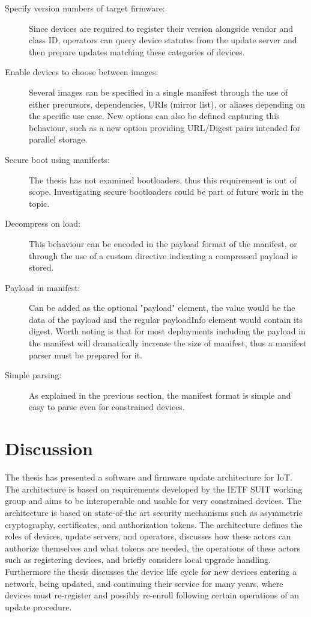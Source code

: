 \documentclass[0-thesis.tex]{subfiles}
\begin{document}
\begin{description}
    \item[Specify version numbers of target firmware:]
        Since devices are required to register their version alongside vendor and class
        ID, operators can query device statutes from the update server and then prepare
        updates matching these categories of devices.

    \item[Enable devices to choose between images:]
        Several images can be specified in a single manifest through the use of either
        precursors, dependencies, URIs (mirror list), or aliases depending on the specific
        use case. New options can also be defined capturing this behaviour, such as a new
        option providing URL/Digest pairs intended for parallel storage.

    \item[Secure boot using manifests:]
        The thesis has not examined bootloaders, thus this requirement is out of scope.
        Investigating secure bootloaders could be part of future work in the topic.

    \item[Decompress on load:]
        This behaviour can be encoded in the payload format of the manifest, or through
        the use of a custom directive indicating a compressed payload is stored.

    \item[Payload in manifest:]
        Can be added as the optional "payload" element, the value would be the data of the
        payload and the regular payloadInfo element would contain its digest. Worth noting
        is that for most deployments including the payload in the manifest will
        dramatically increase the size of manifest, thus a manifest parser must be
        prepared for it.

    \item[Simple parsing:]
        As explained in the previous section, the manifest format is simple and easy to
        parse even for constrained devices.
\end{description}

\section{Discussion}
\label{sec:discussion}
The thesis has presented a software and firmware update architecture for IoT. The
architecture is based on requirements developed by the IETF SUIT working group and aims to
be interoperable and usable for very constrained devices. The architecture is based on
state-of-the art security mechanisms such as asymmetric cryptography, certificates, and
authorization tokens. The architecture defines the roles of devices, update servers, and
operators, discusses how these actors can authorize themselves and what tokens are needed,
the operations of these actors such as registering devices, and briefly considers local
upgrade handling. Furthermore the thesis discusses the device life cycle for new devices
entering a network, being updated, and continuing their service for many years, where
devices must re-register and possibly re-enroll following certain operations of an update
procedure.
\end{document}
